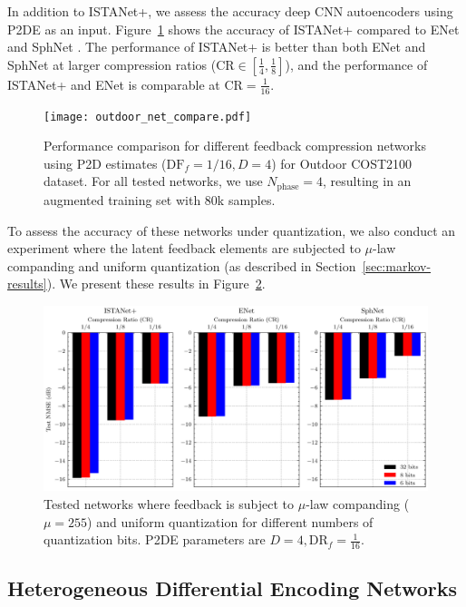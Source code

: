 In addition to ISTANet+, we assess the accuracy deep CNN autoencoders using P2DE as an input. Figure~\ref{fig:outdoor_net_ablation} shows the accuracy of ISTANet+ compared to ENet \cite{ref:Sun2021ENet} and SphNet \cite{ref:liu2020sphnet}. The performance of ISTANet+ is better than both ENet and SphNet at larger compression ratios ($\text{CR}\in [\frac 14, \frac 18]$), and the performance of ISTANet+ and ENet is comparable at $\text{CR}=\frac {1}{16}$.

\begin{figure}[!hbtp]
    \centering
    \texttt{[image: outdoor\_net\_compare.pdf]}
    \caption{Performance comparison for different feedback compression networks using P2D estimates ($\text{DF}_f=1/16, D=4$) for Outdoor COST2100 dataset. For all tested networks, we use $N_{\text{phase}}=4$, resulting in an augmented training set with $80$k samples.}
    \label{fig:outdoor_net_ablation}
\end{figure}

To assess the accuracy of these networks under quantization, we also conduct an experiment where the latent feedback elements are subjected to $\mu$-law companding and uniform quantization (as described in Section~\ref{sec:markov-results}). We present these results in Figure~\ref{fig:net_quant}.

\begin{figure}[!hbtp]
    \centering
    \includegraphics[width=\linewidth]{./images/outdoor_net_quant.pdf}
    \caption{Tested networks where feedback is subject to $\mu$-law companding ($\mu=255$) and uniform quantization for different numbers of quantization bits. P2DE parameters are $D=4, \text{DR}_f=\frac{1}{16}$.}
    \label{fig:net_quant}
\end{figure}

\subsection{Heterogeneous Differential Encoding Networks}

